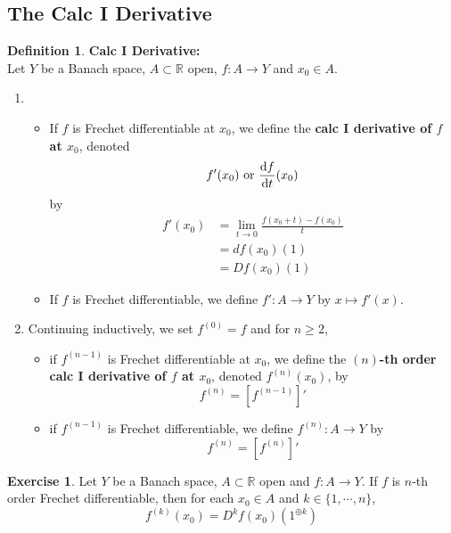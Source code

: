 \documentclass[12pt]{amsart}
\theoremstyle{definition}
\newtheorem{defn}[definition]{Definition}
\newtheorem{ex}[definition]{Exercise}
\newcommand{\R}{\mathbb{R}}
\begin{document}
	
	
	
	
	
	
	
	\newpage
	\subsection{The Calc I Derivative}
	\begin{defn}\textbf{Calc I Derivative:}\\
	Let $Y$ be a Banach space, $A \subset \R$ open, $f:A \rightarrow Y$ and $x_0 \in A$. 
	\begin{enumerate}
	\item 
	\begin{itemize}
	\item If $f$ is Frechet differentiable at $x_0$, we define the \textbf{calc I derivative of $f$ at $x_0$}, denoted $$f'(x_0) \text{ or } \dv{f}{t}{(x_0)}$$ by
	\begin{align*}
	f'(x_0) 
	&= \lim_{t \rightarrow 0} \frac{f(x_0 + t) - f(x_0)}{t} \\
	&= df(x_0)(1) \\
	&= Df(x_0)(1)
	\end{align*}
	\item If $f$ is Frechet differentiable, we define $f':A \rightarrow Y$ by $x \mapsto f'(x)$. 
	\end{itemize}
	\item Continuing inductively, we set $f^{(0)} = f$ and for $n \geq 2$,
	\begin{itemize}
	\item  if $f^{(n-1)}$ is Frechet differentiable at $x_0$, we define the \textbf{$(n)$-th order calc I derivative of $f$ at $x_0$}, denoted $f^{(n)}(x_0)$, by $$f^{(n)} = [f^{(n-1)}]'$$ 
	\item if $f^{(n-1)}$ is Frechet differentiable, we define $f^{(n)}:A \rightarrow Y$ by $$f^{(n)} = [f^{(n)}]'$$ 
	\end{itemize}
	\end{enumerate}
	\end{defn}	
	
	\begin{ex}
	Let $Y$ be a Banach space, $A \subset \R$ open and $f:A \rightarrow Y$. If $f$ is $n$-th order Frechet differentiable, then for each $x_0 \in A$ and $k \in \{1, \cdots, n\}$, $$f^{(k)}(x_0) = D^kf(x_0)(1^{\oplus k})$$
	\end{ex}
	
\end{document}
